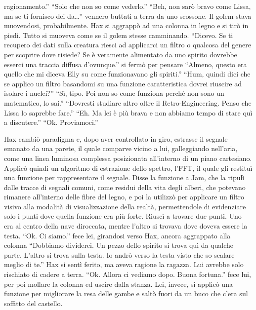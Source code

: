     ragionamento.'' ``Solo che non so come vederlo.'' ``Beh, non sarò bravo
    come Lissa, ma se ti fornisco dei da\dots{}'' vennero buttati a terra
    da uno scossone. Il golem stava muovendosi, probabilmente. Hax si
    aggrappò ad una colonna in legno e si tirò in piedi. Tutto si muoveva
    come se il golem stesse camminando. ``Dicevo. Se ti
    recupero dei dati sulla creatura riesci ad applicarci un filtro o
    qualcosa del genere per scoprire dove risiede? Se è veramente
    alimentato da uno spirito dovrebbe esserci una traccia diffusa
    d'ovunque.'' si fermò per pensare ``Almeno, questo era quello che mi
    diceva Elly su come funzionavano gli spiriti.'' ``Hum, quindi dici che
    se applico un filtro basandomi su una funzione caratteristica dovrei
    riuscire ad isolare i nuclei?'' ``Sì, tipo. Poi non so come funziona
    perchè non sono un matematico, lo sai.'' ``Dovresti studiare altro
    oltre il Retro-Engineering. Penso che Lissa lo saprebbe fare.'' ``Eh.
    Ma lei è più brava e non abbiamo tempo di stare quì a discutere.''
    ``Ok. Proviamoci.''

    Hax cambiò paradigma e, dopo aver controllato in giro, estrasse il
    segnale emanato da una parete, il quale comparve vicino a lui,
    galleggiando nell'aria, come una linea luminosa complessa posizionata
    all'interno di un piano cartesiano. Applicò quindi un algoritmo di
    estrazione dello spettro, l'FFT, il quale gli restituì una funzione
    per rappresentare il segnale. Disse la funzione a Jam, che la ripulì
    dalle tracce di segnali comuni, come residui della vita degli alberi,
    che potevano rimanere all'interno delle fibre del legno, e poi la
    utilizzò per applicare un filtro visivo alla modalità di
    visualizzazione della realtà, permettendole di evidenziare solo i punti
    dove quella funzione era più forte. Riuscì a trovare due punti. Uno era
    al centro della nave diroccata, mentre l'altro si trovava dove doveva
    essere la testa. ``Ok. Ci siamo.'' fece lei, girandosi verso Hax,
    ancora aggrappato alla colonna ``Dobbiamo dividerci. Un pezzo dello
    spirito si trova quì da qualche parte. L'altro si trova sulla testa. Io
    andrò verso la testa visto che so scalare meglio di te.'' Hax si sentì
    ferito, ma aveva ragione la ragazza. Lui avrebbe solo rischiato di
    cadere a terra. ``Ok. Allora ci vediamo dopo. Buona fortuna.'' fece
    lui, per poi mollare la colonna ed uscire dalla stanza. Lei, invece, si
    applicò una funzione per migliorare la resa delle gambe
    e saltò fuori da un buco che c'era sul soffitto del castello.
    

